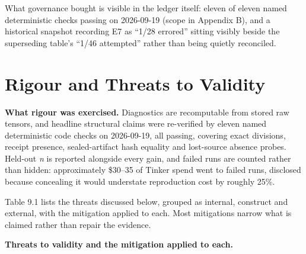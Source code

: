 \documentclass[12pt,a4paper]{report}
\begin{document}
What governance bought is visible in the ledger itself: eleven of eleven
named deterministic checks passing on 2026-09-19 (scope in Appendix B),
and a historical snapshot recording E7 as ``1/28 errored'' sitting
visibly beside the superseding table's ``1/46 attempted'' rather than
being quietly reconciled.

\section{Rigour and Threats to
Validity}\label{rigour-and-threats-to-validity}

\textbf{What rigour was exercised.} Diagnostics are recomputable from
stored raw tensors, and headline structural claims were re-verified by
eleven named deterministic code checks on 2026-09-19, all passing,
covering exact divisions, receipt presence, sealed-artifact hash
equality and lost-source absence probes. Held-out \emph{n} is reported
alongside every gain, and failed runs are counted rather than hidden:
approximately \$30--35 of Tinker spend went to failed runs, disclosed
because concealing it would understate reproduction cost by roughly
25\%.

Table 9.1 lists the threats discussed below, grouped as internal,
construct and external, with the mitigation applied to each. Most
mitigations narrow what is claimed rather than repair the evidence.

\textbf{Threats to validity and the mitigation applied to each.}
\end{document}
